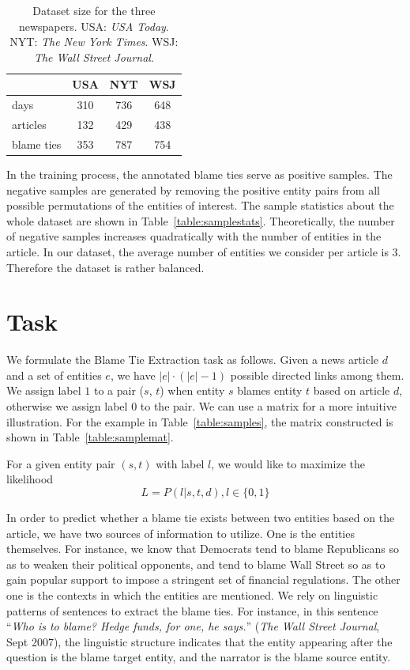 \documentclass[letterpaper]{article} %
\begin{document}
\begin{table}[t]
\centering
\begin{tabular}{l c c c}
 \hline
 & {\bf USA} &  {\bf NYT}  & {\bf WSJ} \\
 \hline\hline
 days & 310 & 736 & 648 \\
 articles & 132 & 429 & 438 \\
 blame ties & 353 & 787 & 754 \\
 \hline
\end{tabular}
\caption{Dataset size for the three newspapers. USA: {\it USA Today}. NYT: {\it The New York Times}. WSJ: {\it The Wall Street Journal}.}
\label{table:dataset}
\end{table}

In the training process, the annotated blame ties serve as positive samples. The negative samples are generated by removing the positive entity pairs from all possible permutations of the entities of interest. The sample statistics about the whole dataset are shown in Table~\ref{table:samplestats}. Theoretically, the number of negative samples increases quadratically with the number of entities in the article. In our dataset, the average number of entities we consider per article is 3. Therefore the dataset is rather balanced.

\section{Task}

We formulate the Blame Tie Extraction task as follows. Given a news article $d$ and a set of entities $e$, we have $ |e| \cdot (|e| - 1)$ possible directed links among them. We assign label $1$ to a pair ($s$, $t$) when entity $s$ blames entity $t$ based on article $d$, otherwise we assign label $0$ to the pair. We can use a matrix for a more intuitive illustration. For the example in Table~\ref{table:samples}, the matrix constructed is shown in Table~\ref{table:samplemat}.

For a given entity pair $(s, t)$ with label $l$, we would like to maximize the likelihood $$L = P(l | s, t, d), l \in \{0, 1\}$$

In order to predict whether a blame tie exists between two entities based on the article, we have two sources of information to utilize. One is the entities themselves. For instance, we know that Democrats tend to blame Republicans so as to weaken their political opponents, and tend to blame Wall Street so as to gain popular support to impose a stringent set of financial regulations. The other one is the contexts in which the entities are mentioned. We rely on linguistic patterns of sentences to extract the blame ties. For instance, in this sentence ``{\it Who is to blame? Hedge funds, for one, he says.}'' ({\it The Wall Street Journal}, Sept 2007), the linguistic structure indicates that the entity appearing after the question is the blame target entity, and the narrator is the blame source entity.
\end{document}
